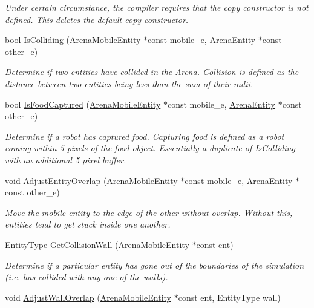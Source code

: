 \begin{DoxyCompactItemize}
\begin{DoxyCompactList}\small\item\em Under certain circumstance, the compiler requires that the copy constructor is not defined. This {\ttfamily deletes} the default copy constructor. \end{DoxyCompactList}\item 
bool \hyperlink{classArena_ab4479b0268867602d0c4b510d5f99aff}{Is\+Colliding} (\hyperlink{classArenaMobileEntity}{Arena\+Mobile\+Entity} $\ast$const mobile\+\_\+e, \hyperlink{classArenaEntity}{Arena\+Entity} $\ast$const other\+\_\+e)
\begin{DoxyCompactList}\small\item\em Determine if two entities have collided in the \hyperlink{classArena}{Arena}. Collision is defined as the distance between two entities being less than the sum of their radii. \end{DoxyCompactList}\item 
bool \hyperlink{classArena_a50e4fa2b864a87682060e97223769907}{Is\+Food\+Captured} (\hyperlink{classArenaMobileEntity}{Arena\+Mobile\+Entity} $\ast$const mobile\+\_\+e, \hyperlink{classArenaEntity}{Arena\+Entity} $\ast$const other\+\_\+e)
\begin{DoxyCompactList}\small\item\em Determine if a robot has captured food. Capturing food is defined as a robot coming within 5 pixels of the food object. Essentially a duplicate of Is\+Colliding with an additional 5 pixel buffer. \end{DoxyCompactList}\item 
void \hyperlink{classArena_a2506fab770b6070d8f061bcab4c65138}{Adjust\+Entity\+Overlap} (\hyperlink{classArenaMobileEntity}{Arena\+Mobile\+Entity} $\ast$const mobile\+\_\+e, \hyperlink{classArenaEntity}{Arena\+Entity} $\ast$const other\+\_\+e)\hypertarget{classArena_a2506fab770b6070d8f061bcab4c65138}{}\label{classArena_a2506fab770b6070d8f061bcab4c65138}

\begin{DoxyCompactList}\small\item\em Move the mobile entity to the edge of the other without overlap. Without this, entities tend to get stuck inside one another. \end{DoxyCompactList}\item 
Entity\+Type \hyperlink{classArena_a7b72cf7688ee6ab1395bf438663bc1da}{Get\+Collision\+Wall} (\hyperlink{classArenaMobileEntity}{Arena\+Mobile\+Entity} $\ast$const ent)
\begin{DoxyCompactList}\small\item\em Determine if a particular entity has gone out of the boundaries of the simulation (i.\+e. has collided with any one of the walls). \end{DoxyCompactList}\item 
void \hyperlink{classArena_a51c1e99dfd9a618c6041fd22d0a11959}{Adjust\+Wall\+Overlap} (\hyperlink{classArenaMobileEntity}{Arena\+Mobile\+Entity} $\ast$const ent, Entity\+Type wall)\hypertarget{classArena_a51c1e99dfd9a618c6041fd22d0a11959}{}\label{classArena_a51c1e99dfd9a618c6041fd22d0a11959}


\end{DoxyCompactItemize}
